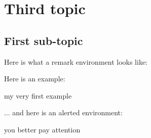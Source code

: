 \section{Third topic}

\sectioncover

\subsection{First sub-topic}

\subsectioncover

\begin{frame}
  Here is what a remark environment looks like:

  \begin{remark}
    \lipsum[2-2]
  \end{remark}

  Here is an example:

  \begin{exampleblock}{my very first example}
    \lipsum[3-3]
  \end{exampleblock}
\end{frame}

\begin{frame}
  ... and here is an alerted environment:

  \begin{alertblock}{you better pay attention}
    \lipsum[4-4]
  \end{alertblock}
\end{frame}
